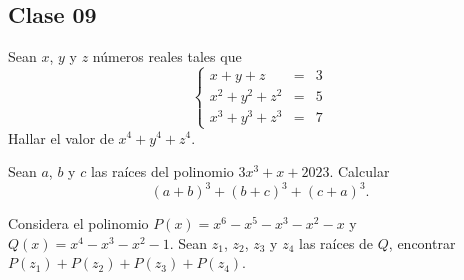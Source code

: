 \subsection{Clase 09}

\begin{section-problem}
    Sean $x$, $y$ y $z$ números reales tales que
    \[
        \left\{
        \begin{array}{rcl}
            x + y + z & =& 3\\
            x^2 + y^2 + z^2 & =& 5\\
            x^3 + y^3 + z^3 & =& 7
        \end{array}
        \right.
    \]
    Hallar el valor de $x^4 + y^4 + z^4$.
\end{section-problem}

\begin{section-problem}
    Sean $a$, $b$ y $c$ las raíces del polinomio $3x^3 + x + 2023$.
    Calcular \[(a + b)^3 + (b + c)^3 + (c + a)^3.\]
\end{section-problem}

\begin{section-problem}
    Considera el polinomio $P(x) = x^6 - x^5 - x^3 - x^2 - x$ y $Q(x) = x^4 - x^3 - x^2 - 1$.
    Sean $z_1$, $z_2$, $z_3$ y $z_4$ las raíces de $Q$, encontrar $P(z_1) + P(z_2) + P(z_3) + P(z_4)$.
\end{section-problem}